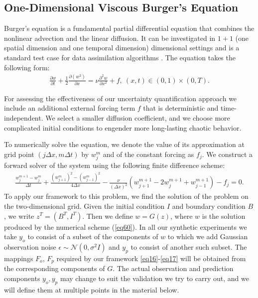 \documentclass[article,ij4uq]{ij4uq}              %
\newcommand{\cm}[1]{{\color{red}Mihai:{#1}}}
\begin{document}
\subsection{One-Dimensional Viscous Burger's Equation}\label{sec:51}
\par Burger's equation is a fundamental partial differential equation that combines the nonlinear advection and the linear diffusion. It can be investigated in $1+1$ (one spatial dimension and one temporal dimension) dimensional settings and is a standard test case for data assimilation algorithms \cite{xu2016limited,apte2010variational,kalnay2003atmospheric,lewis2006dynamic,uboldi2000time}.
The equation takes the following form:
\begin{align}
    \frac{\partial w}{\partial t}+\frac{1}{2}\frac{\partial (w^{2})}{\partial x}=\nu\frac{\partial^{2}w}{\partial x^{2}}+f,\ (x,t)\in(0,1)\times(0,T).\label{eq59}
\end{align}
\par For assessing the effectiveness of our uncertainty quantification approach we include an additional external forcing term $f$ that is deterministic and time-independent. We select  a smaller diffusion coefficient, and we choose more complicated initial conditions to engender more long-lasting chaotic behavior. 
\par To numerically solve the equation, we denote the value of its approximation at grid point $(j\Delta x,m\Delta t)$ by $w_{j}^{m}$ and of the constant forcing as $f_j$. We construct a forward solver of the system using the following finite difference scheme:
\begin{align}
    \frac{w_{j}^{m+1}-w_{j}^{m}}{\Delta t}+\frac{(w_{j+1}^{m})^{2}-(w_{j-1}^{m})^{2}}{4\Delta x}-\frac{\nu}{(\Delta x)^{2}}(w_{j+1}^{m+1}-2w_{j}^{m+1}+w_{j-1}^{m+1})-f_{j}=0.\label{eq60}
\end{align}
 To apply our framework to this problem, we find the solution of the problem on the two-dimensional grid. Given the initial condition $I$ and boundary condition $B$, we write $z^{T}=(B^{T},I^{T})$. Then we define $w=G(z)$, where $w$ is the solution produced by the numerical scheme (\ref{eq60}). In all our synthetic experiments we take $y_o$ to consist of
 a subset of the components of $w$ to which we add Gaussian observation noise $\epsilon\sim\mathcal{N}(0,\sigma^{2}I)$ and $y_p$ to consist of another such subset. The mappings $F_o$, $F_p\label{FoFp}$ required by our framework \eqref{eq16}-\eqref{eq17} will be obtained from the corresponding components of $G$. The actual observation and prediction components $y_o,y_p$ may change to suit the validation we try to carry out, and we will define them at multiple points in the  material below.  
\end{document}
